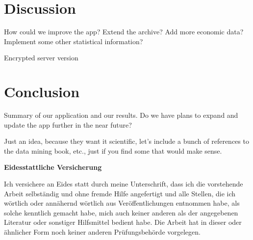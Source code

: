 \documentclass[12pt,a4paper]{article}
\begin{document}
\hypertarget{discussion}{%
\section{Discussion}\label{discussion}}

How could we improve the app? Extend the archive? Add more economic
data? Implement some other statistical information?

Encrypted server version

\hypertarget{conclusion}{%
\section{Conclusion}\label{conclusion}}

Summary of our application and our results. Do we have plans to expand
and update the app further in the near future?

Just an idea, because they want it scientific, let's include a bunch of
references to the data mining book, etc., just if you find some that
would make sense.

\newpage
\renewcommand*{\mkbibnamefamily}[1]{\textbf{#1}}
\renewcommand*{\mkbibnamegiven}[1]{\textbf{#1}}
\renewcommand*{\mkbibnameprefix}[1]{\textbf{#1}}
\renewcommand*{\mkbibnamesuffix}[1]{\textbf{#1}}
\printbibliography[title=References]

\newpage
\textbf{Eidesstattliche Versicherung}

\bigskip

Ich versichere an Eides statt durch meine Unterschrift, dass ich die vorstehende Arbeit selbständig und ohne fremde Hilfe angefertigt und alle Stellen, die ich wörtlich oder annähernd wörtlich aus Veröffentlichungen entnommen habe, als solche kenntlich gemacht habe, mich auch keiner anderen als der angegebenen Literatur oder sonstiger Hilfsmittel bedient habe. Die Arbeit hat in dieser oder ähnlicher Form noch keiner anderen Prüfungsbehörde vorgelegen.

\vspace{1cm}
\rule{0pt}{2\baselineskip} %
\par\noindent{} \hfill\makebox[2.25in]{\hrulefill}%
\par\noindent\makebox[2.25in][l]{} \hfill{}%
\end{document}
